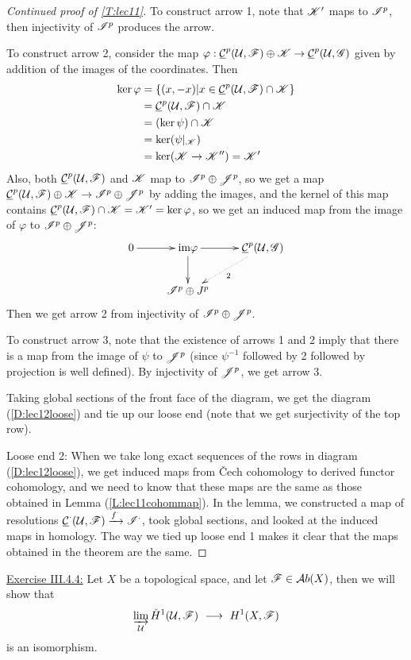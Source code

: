 \begin{proof}[Continued proof of \ref{T:lec11}]
 To construct arrow 1, note that $\mathscr{K}'$ maps to $\mathscr{I}^p$, then
 injectivity of $\mathscr{I}^p$ produces the arrow.

 To construct arrow 2, consider the map $\varphi:\underline{\mathcal{C}}^p(\mathcal{U},\mathscr{F})\oplus \mathscr{K}
 \to \underline{\mathcal{C}}^p(\mathcal{U},\mathscr{G})$ given by addition of the images of the
 coordinates.  Then
 \begin{align*}
  \ker \varphi &= \{(x,-x)|x\in \underline{\mathcal{C}}^p(\mathcal{U},\mathscr{F})\cap \mathscr{K}\}\\
    &= \underline{\mathcal{C}}^p(\mathcal{U},\mathscr{F})\cap \mathscr{K} \\
    &= (\ker \psi) \cap \mathscr{K}\\
    &= \ker (\psi|_{\mathscr{K}})\\
    &= \ker(\mathscr{K}\to \mathscr{K}'') = \mathscr{K}'
 \end{align*}
Also, both $\underline{\mathcal{C}}^p(\mathcal{U},\mathscr{F})$ and $\mathscr{K}$ map to $\mathscr{I}^p\oplus \mathscr{J}^p$, so we
get a map $\underline{\mathcal{C}}^p(\mathcal{U},\mathscr{F})\oplus \mathscr{K}\to \mathscr{I}^p\oplus \mathscr{J}^p$ by adding the
images, and the kernel of this map contains $\underline{\mathcal{C}}^p(\mathcal{U},\mathscr{F})\cap\mathscr{K} =
\mathscr{K}'=\ker \varphi$, so we get an induced map from the image of
$\varphi$ to $\mathscr{I}^p\oplus \mathscr{J}^p$:
\[\xymatrix{
 0\ar[r] & \im \varphi \ar[d] \ar[r] & \C^p(\U,\G)\ar@{.>}[dl]^2\\
 & \I^p\oplus J^p
}\] Then we get arrow 2 from injectivity of $\mathscr{I}^p\oplus \mathscr{J}^p$.

To construct arrow 3, note that the existence of arrows 1 and 2
imply that there is a map from the image of $\psi$ to $\mathscr{J}^p$
(since $\psi^{-1}$ followed by 2 followed by projection is well
defined). By injectivity of $\mathscr{J}^p$, we get arrow 3.

Taking global sections of the front face of the diagram, we get
the diagram (\ref{D:lec12loose}) and tie up our loose end (note
that we get surjectivity of the top row).

\vspace{3mm}

Loose end 2:  When we take long exact sequences of the rows in
diagram (\ref{D:lec12loose}), we get induced maps from \v{C}ech
cohomology to derived functor cohomology, and we need to know that
these maps are the same as those obtained in Lemma
(\ref{L:lec11cohommap}).  In the lemma, we constructed a map of
resolutions $\underline{\mathcal{C}}^{\cdot}(\mathcal{U},\mathscr{F})\xrightarrow{f^{\cdot}} \mathscr{I}^{\cdot}$,
took global sections, and looked at the induced maps in homology.
The way we tied up loose end 1 makes it clear that the maps
obtained in the theorem are the same.
\end{proof}

\vspace{5mm} \underline{Exercise III.4.4:}
 \def\V{\mathcal{V}}
 \def\W{\mathcal{W}}
Let $X$ be a topological space, and let $\mathscr{F}\in \mathcal{A}b(X)$, then we
will show that
\[
 \varinjlim_{\U} \check H^1(\U,\F)\ \longrightarrow\ H^1(X,\F)
\]
is an isomorphism.

